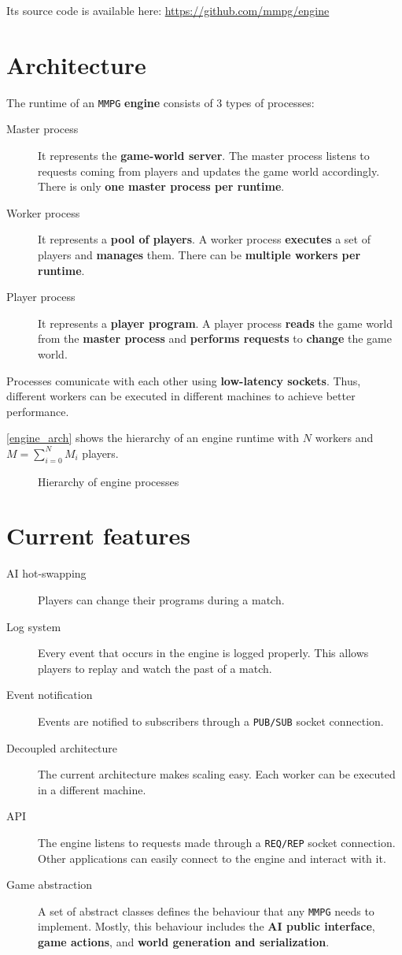 \documentclass[a4paper,11pt,titlepage,abstract,numbers=noenddot,automark,mnsy,intlimits,rgb,dvipsnames]{report}
\begin{document}
Its source code is available here: \url{https://github.com/mmpg/engine}
\section{Architecture}
The runtime of an \texttt{MMPG} \textbf{engine} consists of 3 types of processes:
\begin{description}
\item[Master process]
It represents the \textbf{game-world server}. The master process listens to requests coming from
players and updates the game world accordingly. There is only \textbf{one master process per runtime}.
\item[Worker process]
It represents a \textbf{pool of players}. A worker process \textbf{executes} a set of players and
  \textbf{manages} them. There can be \textbf{multiple workers per runtime}.
\item[Player process]
It represents a \textbf{player program}. A player process \textbf{reads} the game world from the
  \textbf{master process} and \textbf{performs requests} to \textbf{change} the game world.
\end{description}
Processes comunicate with each other using \textbf{low-latency sockets}. Thus, different workers can be executed
in different machines to achieve better performance.

\autoref{engine_arch} shows the hierarchy of an engine runtime with $N$ workers and $M = \sum_{i=0}^{N} M_i$ players.
\begin{figure}[H]
\noindent\resizebox{\textwidth}{!}{

}
\caption{Hierarchy of engine processes}
\label{engine_arch}
\end{figure}
\section{Current features}
\begin{description}
\item[AI hot-swapping]
Players can change their programs during a match.
\item[Log system]
Every event that occurs in the engine is logged properly. This allows players to replay and
  watch the past of a match.
\item[Event notification]
Events are notified to subscribers through a \texttt{PUB/SUB} socket connection.
\item[Decoupled architecture]
The current architecture makes scaling easy. Each worker can be executed in a
  different machine.
\item[API]
The engine listens to requests made through a \texttt{REQ/REP} socket connection. Other applications can
  easily connect to the engine and interact with it.
\item[Game abstraction]
A set of abstract classes defines the behaviour that any \texttt{MMPG} needs to implement.
  Mostly, this behaviour includes the \textbf{AI public interface}, \textbf{game actions}, and \textbf{world generation and
  serialization}.
\end{description}
\end{document}
